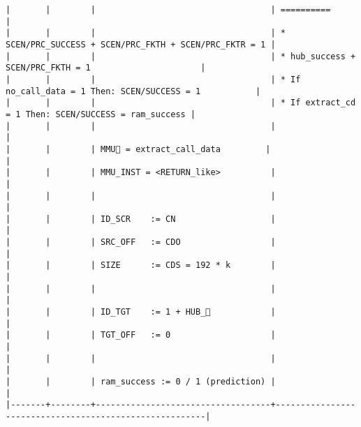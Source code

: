 \documentclass[varwidth=\maxdimen,margin=0.5cm,multi={verbatim}]{standalone}
\begin{document}
\begin{verbatim}
|       |        |                                   | ==========                                             |
|       |        |                                   | * SCEN/PRC_SUCCESS + SCEN/PRC_FKTH + SCEN/PRC_FKTR = 1 |
|       |        |                                   | * hub_success + SCEN/PRC_FKTH = 1                      |
|       |        |                                   | * If no_call_data = 1 Then: SCEN/SUCCESS = 1           |
|       |        |                                   | * If extract_cd   = 1 Then: SCEN/SUCCESS = ram_success |
|       |        |                                   |                                                        |
|       |        | MMU🚩 = extract_call_data         |                                                        |
|       |        | MMU_INST = <RETURN_like>          |                                                        |
|       |        |                                   |                                                        |
|       |        | ID_SCR    := CN                   |                                                        |
|       |        | SRC_OFF   := CDO                  |                                                        |
|       |        | SIZE      := CDS = 192 * k        |                                                        |
|       |        |                                   |                                                        |
|       |        | ID_TGT    := 1 + HUB_            |                                                        |
|       |        | TGT_OFF   := 0                    |                                                        |
|       |        |                                   |                                                        |
|       |        | ram_success := 0 / 1 (prediction) |                                                        |
|-------+--------+-----------------------------------+--------------------------------------------------------|
\end{verbatim}
\end{document}
